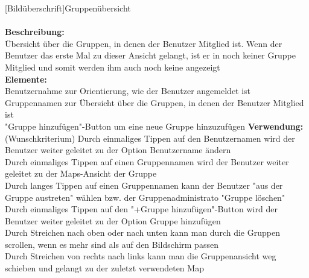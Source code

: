 [Bildüberschrift]Gruppenübersicht\\ \\
\textbf{Beschreibung:}\\
Übersicht über die Gruppen, in denen der Benutzer Mitglied ist. Wenn der Benutzer das erste Mal zu dieser Ansicht gelangt, ist er in noch keiner Gruppe Mitglied und somit werden ihm auch noch keine angezeigt\\
\textbf{Elemente:}\\
Benutzernahme zur Orientierung, wie der Benutzer angemeldet ist\\
Gruppennamen zur Übersicht über die Gruppen, in denen der Benutzer Mitglied ist\\
"Gruppe hinzufügen"-Button um eine neue Gruppe hinzuzufügen
\textbf{Verwendung:}\\
(Wunschkriterium) Durch einmaliges Tippen auf den Benutzernamen wird der Benutzer weiter geleitet zu der Option Benutzername ändern\\
Durch einmaliges Tippen auf einen Gruppennamen wird der Benutzer weiter geleitet zu der Maps-Ansicht der Gruppe\\
Durch langes Tippen auf einen Gruppennamen kann der Benutzer "aus der Gruppe austreten" wählen bzw. der Gruppenadministrato "Gruppe löschen"
Durch einmaliges Tippen auf den "+Gruppe hinzufügen"-Button wird der Benutzer weiter geleitet zu der Option Gruppe hinzufügen\\
Durch Streichen nach oben oder nach unten kann man durch die Gruppen scrollen, wenn es mehr sind als auf den Bildschirm passen\\
Durch Streichen von rechts nach links kann man die Gruppenansicht weg schieben und gelangt zu der zuletzt verwendeten Map\\ \\

